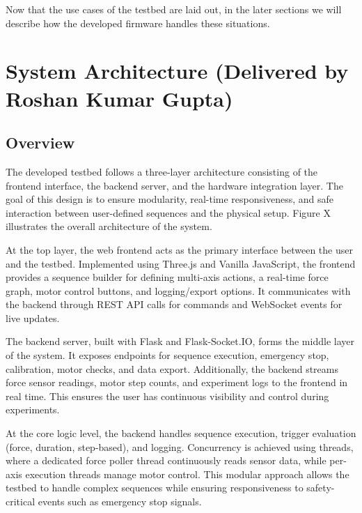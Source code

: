\documentclass[
    twocolumn,
    fontsize = 10pt,
    parskip = half+,
    headings = small,
    headwidth = text,
    footwidth = text,
]{scrartcl}
\begin{document}
Now that the use cases of the testbed are laid out, in the later sections we will describe how the developed firmware handles these situations. 




\section{System Architecture \textnormal{(Delivered by Roshan Kumar Gupta)}}
\label{sec:system-architecture}

\subsection{Overview}
The developed testbed follows a three-layer architecture consisting of the frontend interface, the backend server, and the hardware integration layer. The goal of this design is to ensure modularity, real-time responsiveness, and safe interaction between user-defined sequences and the physical setup. Figure X illustrates the overall architecture of the system.

At the top layer, the web frontend acts as the primary interface between the user and the testbed. Implemented using Three.js and Vanilla JavaScript, the frontend provides a sequence builder for defining multi-axis actions, a real-time force graph, motor control buttons, and logging/export options. It communicates with the backend through REST API calls for commands and WebSocket events for live updates.

The backend server, built with Flask and Flask-Socket.IO, forms the middle layer of the system. It exposes endpoints for sequence execution, emergency stop, calibration, motor checks, and data export. Additionally, the backend streams force sensor readings, motor step counts, and experiment logs to the frontend in real time. This ensures the user has continuous visibility and control during experiments.

At the core logic level, the backend handles sequence execution, trigger evaluation (force, duration, step-based), and logging. Concurrency is achieved using threads, where a dedicated force poller thread continuously reads sensor data, while per-axis execution threads manage motor control. This modular approach allows the testbed to handle complex sequences while ensuring responsiveness to safety-critical events such as emergency stop signals.
\end{document}
